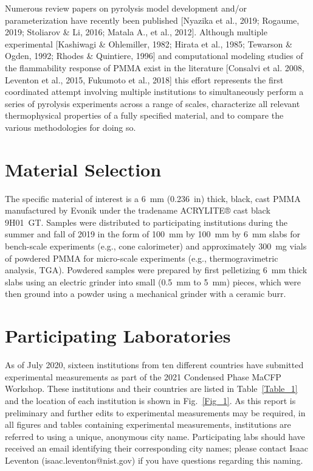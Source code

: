 \documentclass{book}
\begin{document}
Numerous review papers on pyrolysis model development and/or parameterization have recently been published [Nyazika et al., 2019; Rogaume, 2019; Stoliarov \& Li, 2016; Matala A., et al., 2012]. Although multiple experimental [Kashiwagi \& Ohlemiller, 1982; Hirata et al., 1985; Tewarson \& Ogden, 1992; Rhodes \& Quintiere, 1996] and computational modeling studies of the flammability response of PMMA exist in the literature [Consalvi et al. 2008, Leventon et al., 2015, Fukumoto et al., 2018] this effort represents the first coordinated attempt involving multiple institutions to simultaneously perform a series of pyrolysis experiments across a range of scales, characterize all relevant thermophysical properties of a fully specified material, and to compare the various methodologies for doing so.

\section{Material Selection}

The specific material of interest is a 6~mm (0.236~in) thick, black, cast PMMA manufactured by Evonik under the tradename ACRYLITE® cast black 9H01~GT. Samples were distributed to participating institutions during the summer and fall of 2019 in the form of 100~mm by 100~mm by 6~mm slabs for bench-scale experiments (e.g., cone calorimeter) and approximately 300~mg vials of powdered PMMA for micro-scale experiments (e.g., thermogravimetric analysis, TGA). Powdered samples were prepared by first pelletizing 6~mm thick slabs using an electric grinder into small (0.5~mm to 5~mm) pieces, which were then ground into a powder using a mechanical grinder with a ceramic burr.

\section{Participating Laboratories}

As of July 2020, sixteen institutions from ten different countries have submitted experimental measurements as part of the 2021 Condensed Phase MaCFP Workshop. These institutions and their countries are listed in Table~\ref{Table_1} and the location of each institution is shown in Fig.~\ref{Fig_1}. As this report is preliminary and further edits to experimental measurements may be required, in all figures and tables containing experimental measurements, institutions are referred to using a unique, anonymous city name. Participating labs should have received an email identifying their corresponding city names; please contact Isaac Leventon (isaac.leventon@nist.gov) if you have questions regarding this naming.
\end{document}
